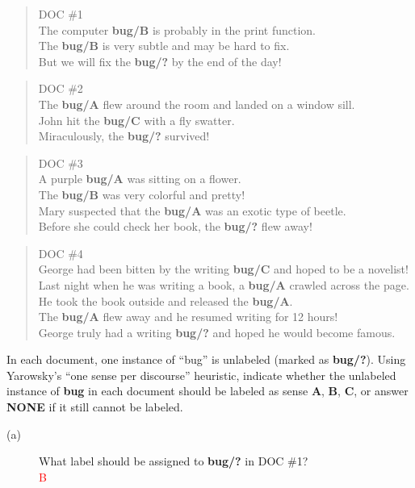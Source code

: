 \documentclass[11pt]{article}
\begin{document}
\begin{enumerate}
\begin{quote}
\small
DOC \#1  \\
The computer {\bf bug/B} is probably in the print function. \\
The {\bf bug/B} is very subtle and may be hard to fix. \\
But we will fix the {\bf bug/?} by the end of the day! 
\end{quote}
\begin{quote}
\small
DOC \#2 \\
The {\bf bug/A} flew around the room and landed on a window sill. \\
John hit the {\bf bug/C} with a fly swatter.  \\
Miraculously, the {\bf bug/?} survived! 
\end{quote}
\begin{quote}
\small
DOC \#3 \\
A purple {\bf bug/A} was sitting on a flower. \\
The {\bf bug/B} was very colorful and pretty! \\
Mary suspected that the {\bf bug/A} was an exotic type of beetle. \\
Before she could check her book, the {\bf bug/?} flew away! 
\end{quote}
\begin{quote}
\small
DOC \#4 \\
George had been bitten by the writing {\bf bug/C} and hoped to be a novelist! \\
Last night when he was writing a book, a {\bf bug/A} crawled across the page. \\
He took the book outside and released the {\bf bug/A}.  \\
The {\bf bug/A} flew away and he resumed writing  for 12 hours! \\
George truly had a writing {\bf bug/?} and hoped he would become famous.
\end{quote}

\newpage
In each document, one instance of ``bug'' is unlabeled (marked
as {\bf bug/?}). Using Yarowsky's ``one sense per discourse''
heuristic, indicate whether the unlabeled instance of {\bf bug} in
each document should
be labeled as sense {\bf A}, {\bf B}, {\bf C}, or answer {\bf NONE} if it still cannot be labeled. 

\begin{description}
\item[(a)] What label should be assigned to {\bf bug/?} in DOC \#1?  \\
\textcolor{red}{B}


\end{description}
\end{enumerate}
\end{document}
